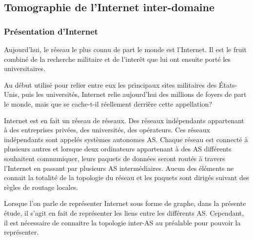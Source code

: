 
% 

\subsection{Tomographie de l'Internet inter-domaine}

\subsubsection{Pr\'esentation d'Internet}

\par
Aujourd'hui, le r\'eseau le plus connu de part le monde est l'Internet. Il est le fruit combin\'e de la recherche militaire et de l'inter\^et que lui ont ensuite port\'e les universitaires.
\par
Au d\'ebut utilis\'e pour relier entre eux les principaux sites militaires des \'Etats-Unis, puis les universit\'es, Internet relie aujourd'hui des millions de foyers de part le monde, mais que se cache-t-il r\'eellement derri\`ere cette appellation?
\par
Internet est en fait un r\'eseau de r\'eseaux. Des r\'eseaux ind\'ependants appartenant \`a des entreprises priv\'ees, des universit\'es, des op\'erateurs. Ces r\'eseaux ind\'ependants sont appel\'es syst\`emes autonomes AS. Chaque r\'eseau est connect\'e \`a plusieurs autres et lorsque deux ordinateurs appartenant \`a des AS diff\'erents souhaitent communiquer, leurs paquets de donn\'ees seront rout\'es \`a travers l'Internet en passant par plusieurs AS interm\'ediaires. Aucun des \'el\'ements ne connait la totalit\'e de la topologie du r\'eseau et les paquets sont dirig\'es suivant des r\`egles de routage locales.
\par
Lorsque l'on parle de repr\'esenter Internet sous forme de graphe, dans la pr\'esente \'etude, il s'agit en fait de repr\'esenter les liens entre les diff\'erents AS. Cependant, il est n\'ecessaire de connaitre la topologie inter-AS au pr\'ealable pour pouvoir la repr\'esenter.

